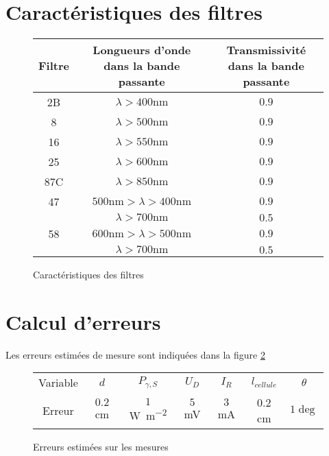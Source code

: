 \section{Caractéristiques des filtres}

\begin{figure}[h]
\centering
\begin{tabulary}{0.7\linewidth}{C C C}
    \toprule
    Filtre & Longueurs d'onde dans la bande passante & Transmissivité dans la bande passante \\
    \midrule
    2B  & $\lambda > 400 \unit{\nano \metre}$ & $0.9$ \\
    8   & $\lambda > 500 \unit{\nano \metre}$ & $0.9$ \\
    16  & $\lambda > 550 \unit{\nano \metre}$ & $0.9$ \\
    25  & $\lambda > 600 \unit{\nano \metre}$ & $0.9$ \\
    87C & $\lambda > 850 \unit{\nano \metre}$ & $0.9$ \\
    47  & $500 \unit{\nano \metre} > \lambda > 400 \unit{\nano \metre}$ & $0.9$ \\
        & $\lambda > 700 \unit{\nano \metre}$ & $0.5$ \\
    58  & $600 \unit{\nano \metre} > \lambda > 500 \unit{\nano \metre}$ & $0.9$ \\
        & $\lambda > 700 \unit{\nano \metre}$ & $0.5$ \\
    \bottomrule
    \end{tabulary}
    \caption{Caractéristiques des filtres \cite{notice}}
    \label{tab:filters}
\end{figure}

\section{Calcul d'erreurs}

Les erreurs estimées de mesure sont indiquées dans la figure \ref{tab:erreurs}

\begin{figure}[H]
    \centering
    \begin{tabulary}{0.7\linewidth}{C C C C C C C}
        \toprule
        Variable & \(d\)      & \(P_{\gamma,S}\) & \(U_D\)   & \(I_R\)  & \(l_{cellule}\) & \(\theta\) \\
        Erreur   & \(0.2\) cm & \(1\) \unit{\watt \per \square \meter}        & \(5\) \unit{\milli\volt} & \(3\) \unit{\milli\ampere} & 0.2 \unit{\centi\meter}      & \(1 \deg\) \\
        \bottomrule
    \end{tabulary}
    \caption{Erreurs estimées sur les mesures}
    \label{tab:erreurs}
\end{figure}

